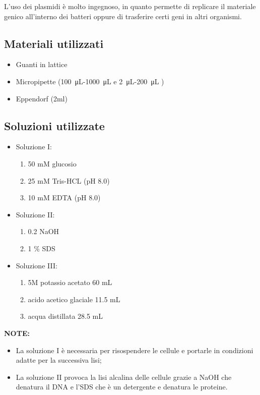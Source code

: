 L'uso dei plasmidi è molto ingegnoso, in quanto permette di replicare il materiale genico all'interno dei batteri
oppure di trasferire certi geni in altri organismi.


\subsection{Materiali utilizzati}

\begin{itemize}
	\item Guanti in lattice
	\item Micropipette (\SI{100}{\micro\liter}-\SI{1000}{\micro\liter} e \SI{2}{\micro\liter}-\SI{200}{\micro\liter}  )
	\item Eppendorf (2ml)
\end{itemize}


\subsection{Soluzioni utilizzate}

\begin{itemize}

	\item Soluzione I:
  \begin{enumerate}
    \item 50 mM glucosio
    \item 25 mM Tris-HCL (pH 8.0)
    \item 10 mM EDTA (pH 8.0)
  \end{enumerate}
	\item Soluzione II:
  \begin{enumerate}
    \item 0.2 NaOH
    \item 1 \% SDS
  \end{enumerate}
	\item Soluzione III:
  \begin{enumerate}
    \item 5M potassio acetato 60 mL
    \item acido acetico glaciale 11.5 mL
    \item acqua distillata 28.5 mL
  \end{enumerate}

\end{itemize}

\vspace{0.5cm}

\textbf{NOTE:}
\begin{itemize}
  \item La soluzione I è necessaria per risospendere le cellule e portarle in condizioni
	adatte per la successiva lisi;
  \item La soluzione II provoca la lisi alcalina delle cellule grazie a NaOH che denatura
	il DNA e l’SDS che è un detergente e denatura le proteine.
\end{itemize}


